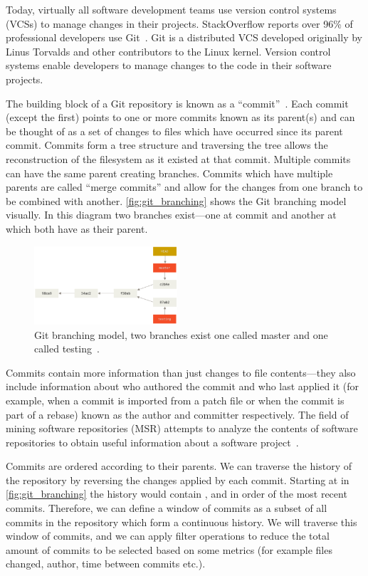 Today, virtually all software development teams use version control systems (VCSs) to manage changes in their projects.
StackOverflow reports over 96\% of professional developers use Git~\cite{vcs_usage}.
Git is a distributed VCS developed originally by Linus Torvalds and other contributors to the Linux kernel.
Version control systems enable developers to manage changes to the code in their software projects.

The building block of a Git repository is known as a ``commit''~\cite{pro_git}.
Each commit (except the first) points to one or more commits known as its parent(s) and can be thought of as a set of changes to files which have occurred since its parent commit.
Commits form a tree structure and traversing the tree allows the reconstruction of the filesystem as it existed at that commit.
Multiple commits can have the same parent creating branches.
Commits which have multiple parents are called ``merge commits'' and allow for the changes from one branch to be combined with another.
\autoref{fig:git_branching} shows the Git branching model visually.
In this diagram two branches exist---one at commit  and another at  which both have  as their parent.

\begin{figure}[ht]
	\centering
	\includegraphics[width=0.475\textwidth]{images/git_branching}
	\caption{Git branching model, two branches exist one called master and one called testing~\cite{pro_git}.}
\label{fig:git_branching}
\end{figure}

Commits contain more information than just changes to file contents---they also include information about who authored the commit and who last applied it (for example, when a commit is imported from a patch file or when the commit is part of a rebase) known as the author and committer respectively.
The field of mining software repositories (MSR) attempts to analyze the contents of software repositories to obtain useful information about a software project~\cite{road_ahead_for_msr}.

Commits are ordered according to their parents.
We can traverse the history of the repository by reversing the changes applied by each commit.
Starting at  in \autoref{fig:git_branching} the history would contain ,  and  in order of the most recent commits.
Therefore, we can define a window of commits as a subset of all commits in the repository which form a continuous history.
We will traverse this window of commits, and we can apply filter operations to reduce the total amount of commits to be selected based on some metrics (for example files changed, author, time between commits etc.).

